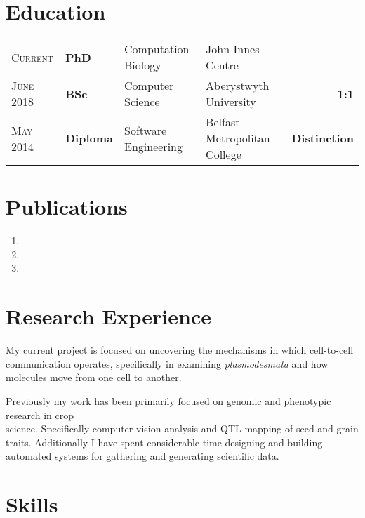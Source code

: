 \documentclass[a4paper,10pt]{article}
\begin{document}
\section{Education}
\begin{tabular}{llllr}

  \textsc{Current}  & \textbf{PhD} & Computation Biology & John Innes Centre &   \\

  \textsc{June} 2018  & \textbf{BSc} & Computer Science & Aberystwyth University & \textbf{1:1} \\

  \textsc{May} 2014& \textbf{Diploma} & Software Engineering & Belfast Metropolitan College &  \textbf{Distinction}

\end{tabular}


\section{Publications}

\begin{enumerate}
\item{}
\item{}
\item{}
\end{enumerate}



\section{Research Experience}

My current project is focused on uncovering the mechanisms in which cell-to-cell communication operates, specifically in examining \textit{plasmodesmata} and how molecules move from one cell to another.

Previously my work has been primarily focused on genomic and phenotypic research in crop \\science. Specifically computer vision analysis and QTL mapping of seed and grain traits. Additionally I have spent considerable time designing and building automated systems for gathering and generating scientific data.


\section{Skills}
\end{document}

